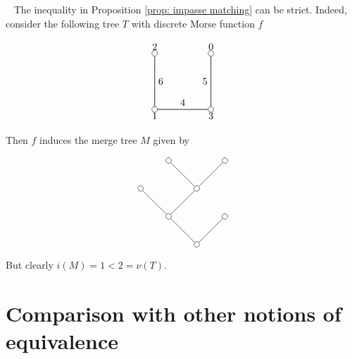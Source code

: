 \documentclass{article}
\theoremstyle{definition}
\newenvironment{example}
{\medskip\par\noindent{\sc Example}\ }
{\par}
\begin{document}
\begin{example}\label{example impasse matching} The inequality in Proposition \ref{prop: impasse matching} can be strict.  Indeed, consider the following tree $T$ with discrete Morse function $f$

$$
\begin{tikzpicture}[scale=1]

\node[inner sep=2pt, circle] (0) at (2,2) [draw] {};
\node[inner sep=2pt, circle] (1) at (0,0) [draw] {};
\node[inner sep=2pt, circle] (2) at (0,2) [draw] {};
\node[inner sep=2pt, circle] (3) at (2,0) [draw] {};



\path[style=semithick] (0) edge node[anchor=east]{{$5$}}(3);
\path[style=semithick] (1) edge node[anchor=south]{{$4$}}(3);
\path[style=semithick] (2) edge node[anchor=west]{{$6$}}(1);



\node[anchor = south]  at (0) {{$0$}};
\node[anchor = north]  at (1) {{$1$}};
\node[anchor = south]  at (2) {{$2$}};
\node[anchor = north]  at (3) {{$3$}};


\end{tikzpicture}
$$

Then $f$ induces the merge tree $M$ given by

$$
\begin{tikzpicture}

\node[inner sep=2pt, circle] (6) at (0,0) [draw] {};
\node[inner sep=2pt, circle] (5) at (-1,1) [draw] {};
\node[inner sep=2pt, circle] (2) at (1,1) [draw] {};
\node[inner sep=2pt, circle] (0) at (-2,2) [draw] {};
\node[inner sep=2pt, circle] (4) at (0,2) [draw] {};
\node[inner sep=2pt, circle] (1) at (-1,3) [draw] {};
\node[inner sep=2pt, circle] (3) at (1,3) [draw] {};



\draw[-]  (6)--(5) node[midway, below] {};
\draw[-]  (6)--(2) node[midway, below] {};
\draw[-]  (0)--(5) node[midway, below] {};
\draw[-]  (4)--(5) node[midway, below] {};
\draw[-]  (4)--(1) node[midway, below] {};
\draw[-]  (4)--(3) node[midway, below] {};
\end{tikzpicture}
$$

But clearly $i(M)=1<2=\nu(T)$.

\end{example}

\section{Comparison with other notions of equivalence}\label{Comparison with other notions of equivalence}
\end{document}
